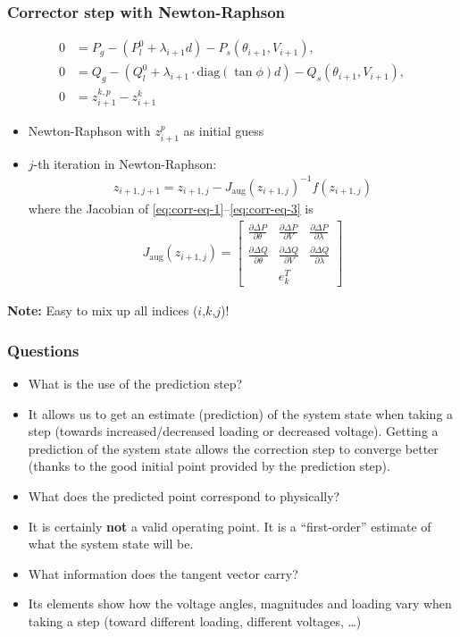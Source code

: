 \documentclass{beamer}
\begin{document}
\begin{frame}
  \frametitle{Corrector step with Newton-Raphson}
\begin{align}
      0 &= P_g - (P_l^0 + \lambda_{i+1} d) - P_s(\theta_{i+1},V_{i+1}), \label{eq:corr-eq-1}\\
      0 &= Q_g - (Q_l^0 + \lambda_{i+1} \cdot \text{diag}(\tan \phi) d)- Q_s(\theta_{i+1},V_{i+1}), \\
      0 &= z_{i+1}^{k,p} - z_{i+1}^{k} \label{eq:corr-eq-3}
\end{align}
\begin{itemize}
\item Newton-Raphson with $z_{i+1}^p$ as initial guess
\item $j$-th iteration in Newton-Raphson:
\begin{align}
  \label{eq:3}
  z_{i+1,j+1} = z_{i+1,j} - J_\text{aug}(z_{i+1,j})^{-1} f(z_{i+1,j})
\end{align}
where the Jacobian of \eqref{eq:corr-eq-1}--\eqref{eq:corr-eq-3} is
\begin{align}
  \label{eq:8}
  J_\text{aug}(z_{i+1,j}) = \begin{bmatrix}
  \frac{\partial \Delta P}{\partial \theta} & \frac{\partial \Delta P}{\partial V} & \frac{\partial \Delta P}{\partial \lambda} \\
  \frac{\partial \Delta Q}{\partial \theta} & \frac{\partial \Delta Q}{\partial V} & \frac{\partial \Delta Q}{\partial \lambda} \\
   & e_k^T & 
  \end{bmatrix}
\end{align}
\end{itemize}
\textbf{Note:} Easy to mix up all indices ($i$,$k$,$j$)!
\end{frame}

\begin{frame}
  \frametitle{Questions}
  \begin{itemize}[<visible@+->]
  \item What is the use of the prediction step?
  \item It allows us to get an estimate (prediction) of the system state when taking a step (towards increased/decreased loading or decreased voltage). Getting a prediction of the system state allows the correction step to converge better (thanks to the good initial point provided by the prediction step).
  \item What does the predicted point correspond to physically?
  \item It is certainly \textbf{not} a valid operating point. It is a ``first-order'' estimate of what the system state will be.
  \item What information does the tangent vector carry?
  \item Its elements show how the voltage angles, magnitudes and loading vary when taking a step (toward different loading, different voltages, \ldots)
  \end{itemize}
\end{frame}
\end{document}
